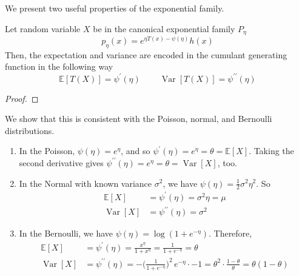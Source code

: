 \documentclass{article}
\DeclareMathOperator{\Var}{Var}
\begin{document}
      We present two useful properties of the exponential family. 

      \begin{theorem}[Moments]
      Let random variable $X$ be in the canonical exponential family $P_\eta$ 
      \[p_\eta (x) = e^{\eta T(x) - \psi(\eta)} h(x)\]
      Then, the expectation and variance are encoded in the cumulant generating function in the following way 
      \[\mathbb{E} [T(X)] = \psi^\prime (\eta) \;\;\;\;\;\;\;\; \Var[T(X)] = \psi^{\prime\prime} (\eta)\]
      \end{theorem}
      \begin{proof}

      \end{proof}

      \begin{example}
      We show that this is consistent with the Poisson, normal, and Bernoulli distributions. 
      \begin{enumerate}
          \item In the Poisson, $\psi(\eta) = e^{\eta}$, and so $\psi^\prime(\eta) = e^\eta = \theta = \mathbb{E}[X]$. Taking the second derivative gives $\psi^{\prime\prime}(\eta) = e^\eta = \theta = \Var[X]$, too. \
          
          \item In the Normal with known variance $\sigma^2$, we have $\psi(\eta) = \frac{1}{2} \sigma^2 \eta^2$. So 
          \begin{align*}
              \mathbb{E}[X] & = \psi^\prime (\eta) = \sigma^2 \eta = \mu \\
              \Var[X] & = \psi^{\prime\prime} (\eta) = \sigma^2
          \end{align*}

          \item In the Bernoulli, we have $\psi(\eta) = \log(1 + e^{-\eta})$. Therefore, 
          \begin{align*}
              \mathbb{E}[X] & = \psi^\prime (\eta) = \frac{x^\eta}{1 + x^{\eta}} = \frac{1}{1 + e^{-\eta}} = \theta \\
              \Var[X] & = \psi^{\prime\prime} (\eta) = -\bigg(\frac{1}{1 + e^{-\eta}}\bigg)^2 \, e^{-\eta} \cdot -1 = \theta^2 \cdot \frac{1 - \theta}{\theta} = \theta (1 - \theta) 
          \end{align*}
      \end{enumerate}
      \end{example}
\end{document}
